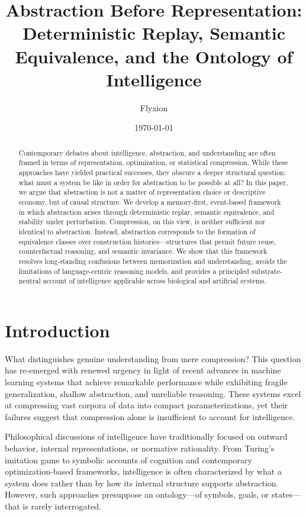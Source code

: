 \documentclass[11pt]{article}
\title{Abstraction Before Representation:\\
Deterministic Replay, Semantic Equivalence, and the Ontology of Intelligence}
\author{Flyxion}
\date{\today}
\begin{document}
\maketitle

\begin{abstract}
Contemporary debates about intelligence, abstraction, and understanding are often framed in terms of representation, optimization, or statistical compression. While these approaches have yielded practical successes, they obscure a deeper structural question: what must a system be like in order for abstraction to be possible at all? In this paper, we argue that abstraction is not a matter of representation choice or descriptive economy, but of causal structure. We develop a memory-first, event-based framework in which abstraction arises through deterministic replay, semantic equivalence, and stability under perturbation. Compression, on this view, is neither sufficient nor identical to abstraction. Instead, abstraction corresponds to the formation of equivalence classes over construction histories—structures that permit future reuse, counterfactual reasoning, and semantic invariance. We show that this framework resolves long-standing confusions between memorization and understanding, avoids the limitations of language-centric reasoning models, and provides a principled substrate-neutral account of intelligence applicable across biological and artificial systems.
\end{abstract}

\section{Introduction}

What distinguishes genuine understanding from mere compression? This question has re-emerged with renewed urgency in light of recent advances in machine learning systems that achieve remarkable performance while exhibiting fragile generalization, shallow abstraction, and unreliable reasoning. These systems excel at compressing vast corpora of data into compact parameterizations, yet their failures suggest that compression alone is insufficient to account for intelligence.

Philosophical discussions of intelligence have traditionally focused on outward behavior, internal representations, or normative rationality. From Turing’s imitation game to symbolic accounts of cognition and contemporary optimization-based frameworks, intelligence is often characterized by what a system does rather than by how its internal structure supports abstraction. However, such approaches presuppose an ontology—of symbols, goals, or states—that is rarely interrogated.
\end{document}
